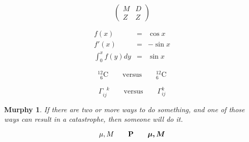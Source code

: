 \documentclass[11pt, twoside, a4paper]{article}
\begin{document}
\begin{displaymath}
    \left(\begin{array}{c|c}
    M & D \\
    \hline
    Z & Z
    \end{array}\right)
\end{displaymath}

\begin{eqnarray}
    f(x) & = & \cos x \\
    f'(x) & = & -\sin x \\
    \int_{0}^{x} f(y)dy &
    = & \sin x
\end{eqnarray}

\begin{displaymath}
    {}^{12}_{\phantom{1}6}\textrm{C}
    \qquad \textrm{versus} \qquad
    {}^{12}_{6}\textrm{C}
\end{displaymath}

\begin{displaymath}
    \Gamma_{ij}^{\phantom{ij}k}
    \qquad \textrm{versus} \qquad
    \Gamma_{ij}^{k}
\end{displaymath}


\newpage
\flushleft
\newtheorem{mur}{Murphy}[section]
\begin{mur}
If there are two or more
ways to do something, and
one of those ways can result
in a catastrophe, then
someone will do it.
\end{mur}


\begin{displaymath}
    \mu, M \qquad \mathbf{P} \qquad
    \mbox{\boldmath $\mu, M$}
\end{displaymath}

\end{document}
